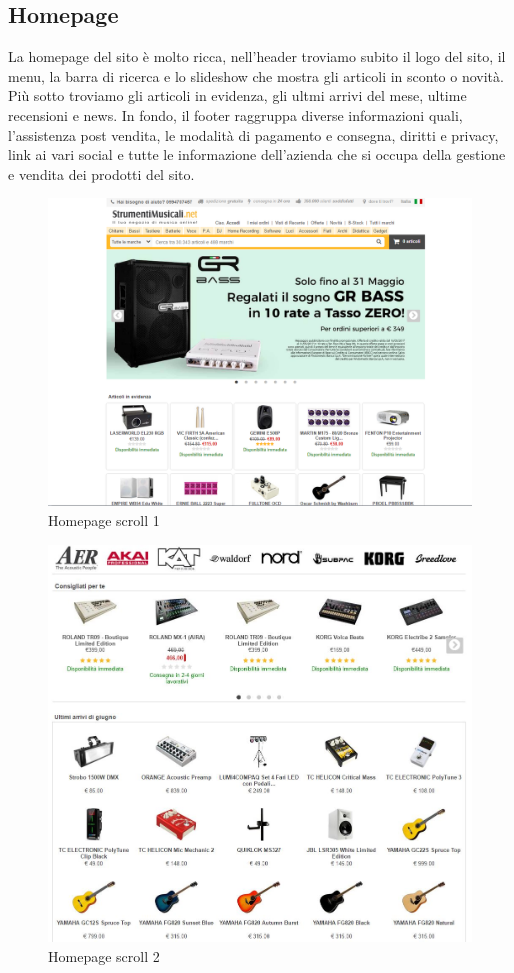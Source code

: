 \documentclass[12pt]{article}
\begin{document}
		\subsection{Homepage}
	La homepage del sito è molto ricca, nell'header troviamo subito il logo del sito, il menu, la barra di ricerca e lo slideshow che mostra gli articoli in sconto o novità. Più sotto troviamo gli articoli in evidenza, gli ultmi arrivi del mese, ultime recensioni e news. In fondo, il footer raggruppa diverse informazioni quali, l'assistenza post vendita, le modalità di pagamento e consegna, diritti e privacy, link ai vari social e tutte le informazione dell'azienda che si occupa della gestione e vendita dei prodotti del sito.
	\vspace{1cm}
	\begin{figure}[ht!]
		\centering	
		\includegraphics[width=150mm]{images/home.png}
		\caption{Homepage scroll 1}
	\end{figure}
	\begin{figure}
		\centering	
		\includegraphics[width=160mm]{images/home2.png}%
		\caption{Homepage scroll 2}
	\end{figure}
\end{document}
